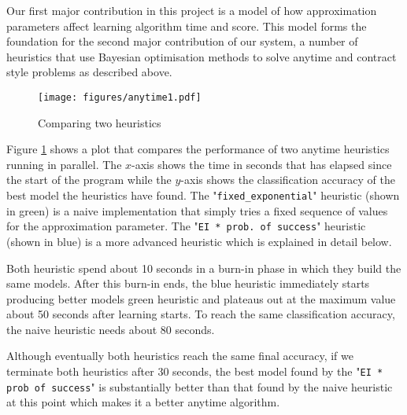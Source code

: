 \documentclass[a4paper,12pt,twoside,openright]{report}
\begin{document}
Our first major contribution in this project is a model of how approximation parameters affect learning algorithm time and score. This model forms the foundation for the second major contribution of our system, a number of heuristics that use Bayesian optimisation methods to solve anytime and contract style problems as described above.



\begin{figure}
\centering
  \texttt{[image: figures/anytime1.pdf]}
  \caption{Comparing two heuristics}
  \label{anytime1}
\end{figure}


Figure \ref{anytime1} shows a plot that compares the performance of two anytime heuristics running in parallel. The $x$-axis shows the time in seconds that has elapsed since the start of the program while the $y$-axis shows the classification accuracy of the best model the heuristics have found. The "\texttt{fixed\_exponential}" heuristic (shown in green) is a naive implementation that simply tries a fixed sequence of values for the approximation parameter. The "\texttt{EI * prob.\ of success}" heuristic (shown in blue) is a more advanced heuristic which is explained in detail below. 

Both heuristic spend about 10 seconds in a burn-in phase in which they build the same models. After this burn-in ends, the blue heuristic immediately starts producing better models green heuristic and plateaus out at the maximum value about 50 seconds after learning starts. To reach the same classification accuracy, the naive heuristic needs about 80 seconds.

Although eventually both heuristics reach the same final accuracy, if we terminate both heuristics after 30 seconds, the best model found by the "\texttt{EI * prob of success}" is substantially better than that found by the naive heuristic at this point which makes it a better anytime algorithm. 

\end{document}
